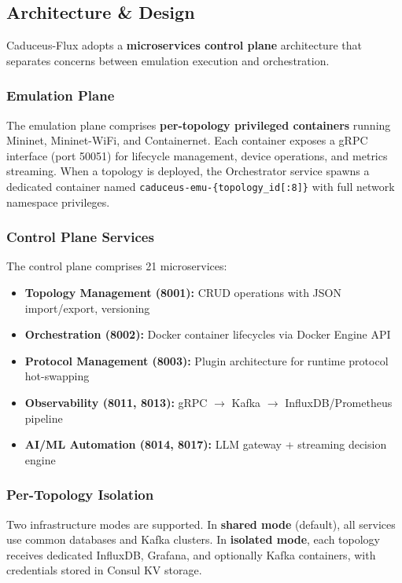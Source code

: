 \documentclass[10pt,a4paper]{article}
\begin{document}
\subsection{Architecture \& Design}

Caduceus-Flux adopts a \textbf{microservices control plane} architecture that separates concerns between emulation execution and orchestration.

\subsubsection{Emulation Plane}
The emulation plane comprises \textbf{per-topology privileged containers} running Mininet, Mininet-WiFi, and Containernet. Each container exposes a gRPC interface (port 50051) for lifecycle management, device operations, and metrics streaming. When a topology is deployed, the Orchestrator service spawns a dedicated container named \texttt{caduceus-emu-\{topology\_id[:8]\}} with full network namespace privileges.

\subsubsection{Control Plane Services}
The control plane comprises 21 microservices:
\begin{itemize}
\item \textbf{Topology Management (8001):} CRUD operations with JSON import/export, versioning
\item \textbf{Orchestration (8002):} Docker container lifecycles via Docker Engine API
\item \textbf{Protocol Management (8003):} Plugin architecture for runtime protocol hot-swapping
\item \textbf{Observability (8011, 8013):} gRPC $\to$ Kafka $\to$ InfluxDB/Prometheus pipeline
\item \textbf{AI/ML Automation (8014, 8017):} LLM gateway + streaming decision engine
\end{itemize}

\subsubsection{Per-Topology Isolation}
Two infrastructure modes are supported. In \textbf{shared mode} (default), all services use common databases and Kafka clusters. In \textbf{isolated mode}, each topology receives dedicated InfluxDB, Grafana, and optionally Kafka containers, with credentials stored in Consul KV storage.
\end{document}
